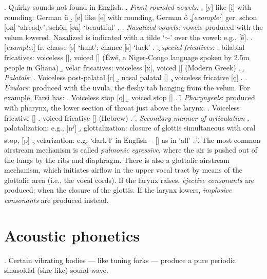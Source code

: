 \documentclass[11pt, oneside]{article}   	%
\begin{document}
\ex. Quirky sounds not found in English.
\a. {\itshape Front rounded vowels:}
	\a. [y] like [i] with rounding: German {\" u}
	\b. [ø] like [e] with rounding, German {\" o}
	\c.[{\itshape example:}] \hspace{0.02cm} ger. schon [on{] }`already'; sch{\" o}n [øn] `beautiful'
	\z.
\b. {\itshape Nasalized vowels:} vowels produced with the velum lowered. Nasalized is indicated with a tilde `$\sim$' over the vowel: e.g., [{\~e}].
	\a.[{\itshape example:}] \hspace{0.02cm} fr. chasse [\textscripta s{]} `hunt'; chance [s{]} `luck'
	\z.
\c. {\itshape special fricatives:}
	\a. bilabial fricatives: voiceless [], voiced [] ({\' E}w{\' e}, a Niger-Congo language spoken by 2.5m people in Ghana)
	\b. velar fricatives: voiceless [x], voiced [] (Modern Greek)
	\z.
\d. {\itshape Palatals}:
	\a. Voiceless post-palatal [c]
	\b. nasal palatal [\textltailn]
	\c. voiceless fricative [ç]
	\z.
\e. {\itshape Uvulars}: produced with the uvula, the fleshy tab hanging from the velum. For example, Farsi has:
	\a. Voiceless stop [q]
	\b. voiced stop []
	\z.
\f. {\itshape Pharyngeals}: produced with pharynx, the lower section of throat just above the larynx.
	\a. Voiceless fricative [\textcrh]
	\b. voiced fricative [\textrevglotstop] (Hebrew)
	\z.
\f. {\itshape Secondary manner of articulation}
	\a. palatalization: e.g., [n$^{j}$]
	\b. glottalization: closure of glottis simultaneous with oral stop, [p\textsuperscript{\textglotstop}]
	\c. velarization: e.g. `dark l' in English -- [\textltilde] as in `all'
	\z. 
\f. The most common airstream mechanism is called {\itshape pulmonic egressive}, where the air is pushed out of the lungs by the ribs and diaphragm. There is also a glottalic airstream mechanism, which initiates airflow in the upper vocal tract by means of the glottalic area (i.e., the vocal cords). If the larynx raises, {\itshape ejective consonants} are produced; when the closure of the glottis. If the larynx lowers, {\itshape implosive consonants} are produced instead.

\newpage

\section{Acoustic phonetics}

\ex. Certain vibrating bodies --- like tuning forks --- produce a pure periodic sinusoidal (sine-like) sound wave.	
\end{document}
